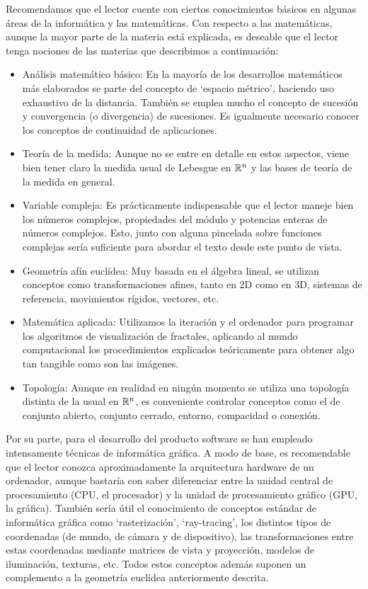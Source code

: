 Recomendamos que el lector cuente con ciertos conocimientos básicos en algunas áreas de la informática y las matemáticas. Con respecto a las matemáticas, aunque la mayor parte de la materia está explicada, es deseable que el lector tenga nociones de las materias que describimos a continuación:

\begin{itemize}
    \item Análisis matemático básico: En la mayoría de los desarrollos matemáticos más elaborados se parte del concepto de `espacio métrico', haciendo uso exhaustivo de la distancia. También se emplea mucho el concepto de sucesión y convergencia (o divergencia) de sucesiones. Es igualmente necesario conocer los conceptos de continuidad de aplicaciones.
    \item Teoría de la medida: Aunque no se entre en detalle en estos aspectos, viene bien tener claro la medida usual de Lebesgue en $\mathbb{R}^n$ y las bases de teoría de la medida en general.
    \item Variable compleja: Es prácticamente indispensable que el lector maneje bien los números complejos, propiedades del módulo y potencias enteras de números complejos. Esto, junto con alguna pincelada sobre funciones complejas sería suficiente para abordar el texto desde este punto de vista.
    \item Geometría afín euclídea: Muy basada en el álgebra lineal, se utilizan conceptos como transformaciones afines, tanto en 2D como en 3D, sistemas de referencia, movimientos rígidos, vectores, etc.
    \item Matemática aplicada: Utilizamos la iteración y el ordenador para programar los algoritmos de visualización de fractales, aplicando al mundo computacional los procedimientos explicados teóricamente para obtener algo tan tangible como son las imágenes.
    \item Topología: Aunque en realidad en ningún momento se utiliza una topología distinta de la usual en $\mathbb{R}^n$, es conveniente controlar conceptos como el de conjunto abierto, conjunto cerrado, entorno, compacidad o conexión.
\end{itemize}

Por su parte, para el desarrollo del producto software se han empleado intensamente técnicas de informática gráfica. A modo de base, es recomendable que el lector conozca aproximadamente la arquitectura hardware de un ordenador, aunque bastaría con saber diferenciar entre la unidad central de procesamiento (CPU, el procesador) y la unidad de procesamiento gráfico (GPU, la gráfica). También sería útil el conocimiento de conceptos estándar de informática gráfica como `rasterización', `ray-tracing', los distintos tipos de coordenadas (de mundo, de cámara y de dispositivo), las transformaciones entre estas coordenadas mediante matrices de vista y proyección, modelos de iluminación, texturas, etc. Todos estos conceptos además suponen un complemento a la geometría euclídea anteriormente descrita. 

